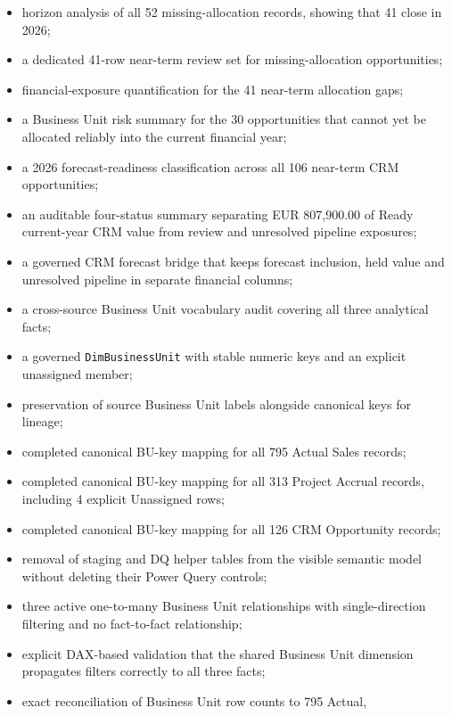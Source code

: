 \documentclass[11pt,a4paper]{article}
\begin{document}
\begin{itemize}[leftmargin=7mm,itemsep=3pt]
    closing and simulated program-start dates for business interpretation;
    \item horizon analysis of all 52 missing-allocation records, showing that
    41 close in 2026;
    \item a dedicated 41-row near-term review set for missing-allocation
    opportunities;
    \item financial-exposure quantification for the 41 near-term allocation gaps;
    \item a Business Unit risk summary for the 30 opportunities that cannot yet be
    allocated reliably into the current financial year;
    \item a 2026 forecast-readiness classification across all 106 near-term CRM
    opportunities;
    \item an auditable four-status summary separating EUR 807,900.00 of Ready
    current-year CRM value from review and unresolved pipeline exposures;
    \item a governed CRM forecast bridge that keeps forecast inclusion, held value
    and unresolved pipeline in separate financial columns;
    \item a cross-source Business Unit vocabulary audit covering all three analytical
    facts;
    \item a governed \texttt{DimBusinessUnit} with stable numeric keys and an explicit
    unassigned member;
    \item preservation of source Business Unit labels alongside canonical keys for
    lineage;
    \item completed canonical BU-key mapping for all 795 Actual Sales records;
    \item completed canonical BU-key mapping for all 313 Project Accrual records,
    including 4 explicit Unassigned rows;
    \item completed canonical BU-key mapping for all 126 CRM Opportunity records;
    \item removal of staging and DQ helper tables from the visible semantic model
    without deleting their Power Query controls;
    \item three active one-to-many Business Unit relationships with single-direction
    filtering and no fact-to-fact relationship;
    \item explicit DAX-based validation that the shared Business Unit dimension
    propagates filters correctly to all three facts;
    \item exact reconciliation of Business Unit row counts to 795 Actual,

\end{itemize}
\end{document}
